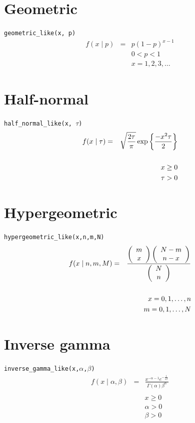\documentclass[]{book}
\begin{document}
\section*{Geometric}
\verb=geometric_like(x, p)=
\begin{eqnarray*}
f(x \mid p) &=& p(1-p)^{x-1} \\
&& 0 < p < 1 \\
&& x = 1,2,3,\ldots
\end{eqnarray*}

\section*{Half-normal}
\verb=half_normal_like(x, =$\tau$\verb=)=
\begin{eqnarray*}
f(x \mid \tau) &=& \sqrt{\frac{2\tau}{\pi}} \exp\left\{ {\frac{-x^2 \tau}{2}}\right\} \\
\vspace{3cm}\\
&& x \ge 0 \\
&& \tau > 0
\end{eqnarray*}

\section*{Hypergeometric}
\verb=hypergeometric_like(x,n,m,N)=
\begin{eqnarray*}
f(x \mid n, m, M) &=& \frac{\left(\begin{array}{c}m \\x\end{array}\right) \left(\begin{array}{c}N-m \\n-x\end{array}\right)}{\left(\begin{array}{c}N \\n\end{array}\right)} \\
\vspace{3cm}\\
&& x = 0,1,\ldots,n\\
&& m = 0,1,\ldots,N
\end{eqnarray*}

\section*{Inverse gamma}
\verb=inverse_gamma_like(x,=$\alpha$\verb=,=$\beta$\verb=)=
\begin{eqnarray*}
f(x \mid \alpha, \beta) &=& \frac{x^{-\alpha - 1} e^{-\frac{1}{x\beta}}}{\Gamma(\alpha)\beta^\alpha} \\
\\
&& x \ge 0 \\
&& \alpha > 0 \\
&& \beta > 0
\end{eqnarray*}
\end{document}
